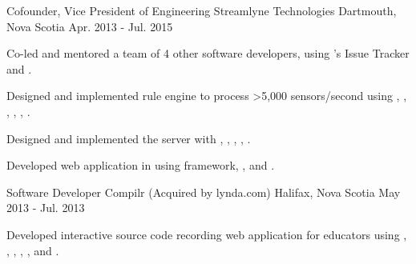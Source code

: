 \begin{cventries}
  \cventry
    {Cofounder, Vice President of Engineering} %
    {Streamlyne Technologies}  %
    {Dartmouth, Nova Scotia} %
    {Apr. 2013 - Jul. 2015} %
    {
      \begin{cvitems} %
	\item {Co-led and mentored a team of 4 other software developers, using 's Issue Tracker and .}
  \item {Designed and implemented rule engine to process >5,000 sensors/second using , , , , , .}
	\item {Designed and implemented the  server with , , , , .}
	\item {Developed web application in  using  framework, , and .}
      \end{cvitems} 
    }

  \cventry
    {Software Developer} %
    {Compilr (Acquired by lynda.com)} %
    {Halifax, Nova Scotia} %
    {May 2013 - Jul. 2013} %
    {
      \begin{cvitems} %
	\item {Developed interactive source code recording web application for educators using , , , , , and .}
      \end{cvitems}
    }

\end{cventries}
